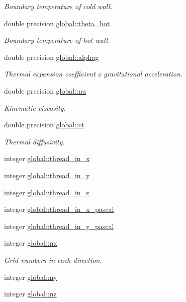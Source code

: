 \begin{DoxyCompactItemize}
\begin{DoxyCompactList}\small\item\em Boundary temperature of cold wall. \end{DoxyCompactList}\item 
double precision \hyperlink{namespaceglobal_a63b846fbcd5aedd45f92a0b1eb972244}{global\+::theta\+\_\+hot}
\begin{DoxyCompactList}\small\item\em Boundary temperature of hot wall. \end{DoxyCompactList}\item 
double precision \hyperlink{namespaceglobal_abe54a711bf9d8c30a6debfb651bdf47d}{global\+::alphag}
\begin{DoxyCompactList}\small\item\em Thermal expansion coefficient x gravitational acceleration. \end{DoxyCompactList}\item 
double precision \hyperlink{namespaceglobal_a48babc9c7f07053917ca1392e7a7b721}{global\+::nu}
\begin{DoxyCompactList}\small\item\em Kinematic viscosity. \end{DoxyCompactList}\item 
double precision \hyperlink{namespaceglobal_acf5521de662915885b6a73718cd6314b}{global\+::ct}
\begin{DoxyCompactList}\small\item\em Thermal diffusivity. \end{DoxyCompactList}\item 
integer \hyperlink{namespaceglobal_a33db542cca17d8c3a156e90d31d8abe5}{global\+::thread\+\_\+in\+\_\+x}
\item 
integer \hyperlink{namespaceglobal_a2694e42b57b63e348f472d5a59bfe0fb}{global\+::thread\+\_\+in\+\_\+y}
\item 
integer \hyperlink{namespaceglobal_a1f39f066a0ed398d1e3e56d13d092718}{global\+::thread\+\_\+in\+\_\+z}
\item 
integer \hyperlink{namespaceglobal_a0c53f9dfde5486b01023d0c9479db29c}{global\+::thread\+\_\+in\+\_\+x\+\_\+pascal}
\item 
integer \hyperlink{namespaceglobal_af395b143d44c9d28517e64a695920dda}{global\+::thread\+\_\+in\+\_\+y\+\_\+pascal}
\end{DoxyCompactItemize}
\textbf{ }\par
\begin{DoxyCompactItemize}
\item 
integer \hyperlink{namespaceglobal_a4ba10a6dbbcebb68e0d5e36a6c291898}{global\+::nx}
\begin{DoxyCompactList}\small\item\em Grid numbers in each direction. \end{DoxyCompactList}\item 
integer \hyperlink{namespaceglobal_a12dd7ca24c7675f31e6de07b1769991c}{global\+::ny}
\item 
integer \hyperlink{namespaceglobal_ab8d7436a6037d4c1b7248107a2f07d76}{global\+::nz}
\end{DoxyCompactItemize}

